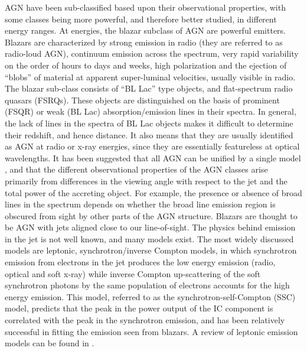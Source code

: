 AGN have been sub-classified based upon their observational
properties, with some classes being more powerful, and therefore
better studied, in different energy ranges. At \Gray energies, the
blazar subclass of AGN are powerful emitters. Blazars are
characterized by strong emission in radio (they are referred to as
radio-loud AGN), continuum emission across the spectrum, very rapid
variability on the order of hours to days and weeks, high polarization
and the ejection of ``blobs'' of material at apparent super-luminal
velocities, usually visible in radio. The blazar sub-class consists of
``BL Lac'' type objects, and flat-spectrum radio quasars
(FSRQs). These objects are distinguished on the basis of prominent
(FSQR) or weak (BL Lac) absorption/emission lines in their spectra. In
general, the lack of lines in the spectra of BL Lac objects makes it
difficult to determine their redshift, and hence distance. It also
means that they are usually identified as AGN at radio or x-ray
energies, since they are essentially featureless at optical
wavelengths. It has been suggested that all AGN can be unified by a
single model
\citep{REF::URRY::PASP1995}, and that the different observational
properties of the AGN classes arise primarily from differences in the
viewing angle with respect to the jet and the total power of the
accreting object. For example, the presence or absence of broad lines
in the spectrum depends on whether the broad line emission region is
obscured from sight by other parts of the AGN structure. Blazars are
thought to be AGN with jets aligned close to our line-of-sight. The
physics behind \Gray emission in the jet is not well known, and many
models exist. The most widely discussed models are leptonic,
synchrotron/inverse Compton models, in which synchrotron emission from
electrons in the jet produces the low energy emission (radio, optical
and soft x-ray) while inverse Compton up-scattering of the soft
synchrotron photons by the same population of electrons accounts for
the high energy emission. This model, referred to as the
synchrotron-self-Compton (SSC) model, predicts that the peak in the
power output of the IC component is correlated with the peak in the
synchrotron emission, and has been relatively successful in fitting
the emission seen from blazars. A review of leptonic emission models
can be found in \citet{REF::BOETTCHER::1999SNOWBIRD}.

